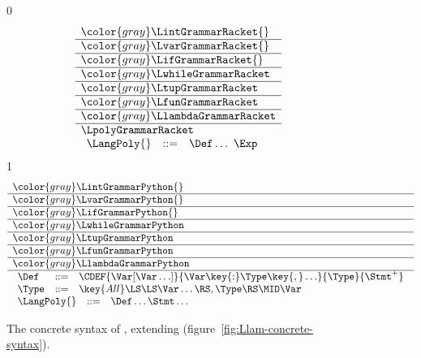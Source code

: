 \documentclass[7x10]{TimesAPriori_MIT}%
\newcommand{\gray}[1]{{\color{gray} #1}}
\def\racketEd{0}
\def\pythonEd{1}
\def\edition{1}
\newcommand{\pythonColor}[0]{}
\numberwithin{theorem}{chapter}
\numberwithin{definition}{chapter}
\numberwithin{equation}{chapter}
\begin{document}
\newcommand{\LpolyGrammarPython}{
\begin{array}{lcl}
   \Def &::=& \CDEF{\Var[\Var\ldots]}{\Var \key{:} \Type\key{,} \ldots}{\Type}{\Stmt^{+}}  \\
  \Type &::=& \key{All}\LS \LS\Var\ldots\RS,\Type\RS \MID \Var 
\end{array}
}

\newcommand{\LpolyASTPython}{
\begin{array}{lcl}
  \Type &::=& \key{AllType}\LP\LS\Var\ldots\RS, \Type\RP
    \MID \key{GenericVar}\LP\Var\RP
\end{array}
}  


\begin{figure}[tp]
\centering
\begin{tcolorbox}[colback=white]
\footnotesize
{\if\edition\racketEd
\[
\begin{array}{l}
  \gray{\LintGrammarRacket{}} \\ \hline
  \gray{\LvarGrammarRacket{}} \\ \hline
  \gray{\LifGrammarRacket{}} \\ \hline
  \gray{\LwhileGrammarRacket} \\ \hline
  \gray{\LtupGrammarRacket} \\   \hline
  \gray{\LfunGrammarRacket} \\   \hline
  \gray{\LlambdaGrammarRacket} \\ \hline
  \LpolyGrammarRacket \\
\begin{array}{lcl}
  \LangPoly{} &::=& \Def \ldots ~ \Exp
\end{array}
\end{array}
\]
\fi}
{\if\edition\pythonEd\pythonColor
\[
\begin{array}{l}
  \gray{\LintGrammarPython{}} \\ \hline
  \gray{\LvarGrammarPython{}} \\ \hline
  \gray{\LifGrammarPython{}} \\ \hline
  \gray{\LwhileGrammarPython} \\ \hline
  \gray{\LtupGrammarPython} \\   \hline
  \gray{\LfunGrammarPython} \\   \hline
  \gray{\LlambdaGrammarPython} \\\hline
  \LpolyGrammarPython \\
  \begin{array}{lcl}
    \LangPoly{} &::=& \Def\ldots \Stmt\ldots
  \end{array}
\end{array}
\]
\fi}
\end{tcolorbox}

\caption{The concrete syntax of \LangPoly{}, extending \LangLam{}
    (figure~\ref{fig:Llam-concrete-syntax}).}
\label{fig:Lpoly-concrete-syntax}
\end{figure}
\end{document}
